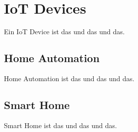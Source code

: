 \section{IoT Devices}
 Ein IoT Device ist das und das und das.
    \subsection{Home Automation}
    Home Automation ist das und das und das.
    \subsection{Smart Home}
    Smart Home ist das und das und das.